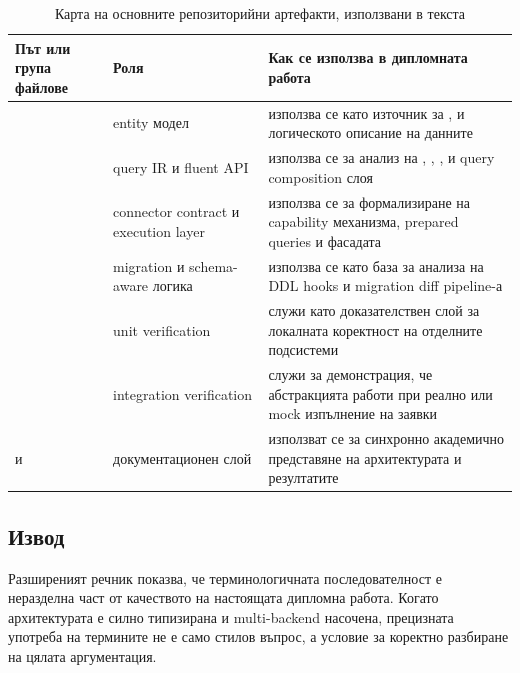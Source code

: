 \begin{table}[H]
\centering
\small
\caption{Карта на основните репозиторийни артефакти, използвани в текста}
\label{tab:repository_artifact_map}
\begin{tabularx}{\textwidth}{L{3.8cm}L{3.1cm}Y}
\toprule
\textbf{Път или група файлове} & \textbf{Роля} & \textbf{Как се използва в дипломната работа} \\
\midrule
{} & entity модел & използва се като източник за ,  и логическото описание на данните \\
 & query IR и fluent API & използва се за анализ на , , ,  и query composition слоя \\
 & connector contract и execution layer & използва се за формализиране на capability механизма, prepared queries и  фасадата \\
 & migration и schema-aware логика & използва се като база за анализа на DDL hooks и migration diff pipeline-а \\
 & unit verification & служи като доказателствен слой за локалната коректност на отделните подсистеми \\
 & integration verification & служи за демонстрация, че абстракцията работи при реално или mock изпълнение на заявки \\
 и  & документационен слой & използват се за синхронно академично представяне на архитектурата и резултатите \\
\bottomrule
\end{tabularx}
\end{table}

\subsection{Извод}

Разширеният речник показва, че терминологичната последователност е неразделна част от качеството на настоящата дипломна работа. Когато архитектурата е силно типизирана и multi-backend насочена, прецизната употреба на термините не е само стилов въпрос, а условие за коректно разбиране на цялата аргументация.
